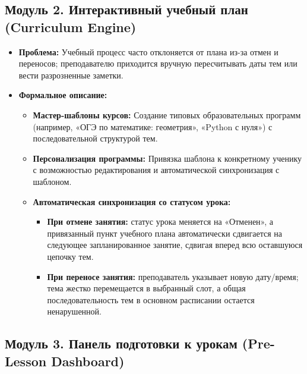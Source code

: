 \documentclass[12pt,a4paper]{article}
\begin{document}
\subsection{Модуль 2. Интерактивный учебный план (Curriculum Engine)}

\begin{itemize}
    \item \textbf{Проблема:} Учебный процесс часто отклоняется от плана из-за отмен и переносов; преподавателю приходится вручную пересчитывать даты тем или вести разрозненные заметки.
    \item \textbf{Формальное описание:}
    \begin{itemize}
        \item \textbf{Мастер-шаблоны курсов:} Создание типовых образовательных программ (например, «ОГЭ по математике: геометрия», «Python с нуля») с последовательной структурой тем.
        \item \textbf{Персонализация программы:} Привязка шаблона к конкретному ученику с возможностью редактирования и автоматической синхронизация с шаблоном.
        \item \textbf{Автоматическая синхронизация со статусом урока:}
        \begin{itemize}
            \item \textbf{При отмене занятия:} статус урока меняется на «Отменен», а привязанный пункт учебного плана автоматически сдвигается на следующее запланированное занятие, сдвигая вперед всю оставшуюся цепочку тем.
            \item \textbf{При переносе занятия:} преподаватель указывает новую дату/время; тема жестко перемещается в выбранный слот, а общая последовательность тем в основном расписании остается ненарушенной.
        \end{itemize}
    \end{itemize}
\end{itemize}

\subsection{Модуль 3. Панель подготовки к урокам (Pre-Lesson Dashboard)}
\end{document}
